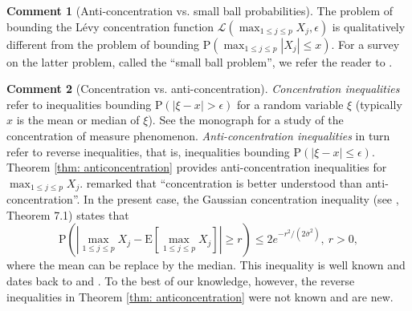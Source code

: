 \documentclass[11pt,reqno]{amsart}
\theoremstyle{definition}
\newtheorem{remark}{Comment}
\newcommand{\LL}{ \mathcal{L}}
\newcommand{\Ep}{{\mathrm{E}}}
\renewcommand{\Pr}{{\mathrm{P}}}
\begin{document}

\begin{remark}[Anti-concentration vs. small ball probabilities]
The problem of bounding the L\'{e}vy concentration function $\LL (\max_{1 \leq j \leq p} X_{j},\epsilon)$ is qualitatively different from
the problem of bounding $\Pr ( \max_{1 \leq j \leq p} | X_{j} | \leq x )$. For a survey on the latter problem, called the ``small ball problem'', we refer the reader to \cite{LS01}.
\end{remark}

\begin{remark}[Concentration vs. anti-concentration]
\label{rem: concentration vs anticoncentration}
{\em Concentration inequalities} refer to inequalities bounding $\Pr (| \xi - x | > \epsilon )$ for a random variable $\xi$ (typically $x$ is the mean or median of $\xi$). See the monograph \cite{L01} for a study of the concentration of measure phenomenon.
{\em Anti-concentration inequalities} in turn refer to reverse inequalities, that is, inequalities bounding $\Pr (| \xi - x | \leq \epsilon )$. Theorem \ref{thm: anticoncentration} provides anti-concentration inequalities for $\max_{1 \leq j \leq p} X_{j}$.
\cite{VR07} remarked that ``concentration is better understood than anti-concentration''. In the present case, the Gaussian concentration inequality (see \cite{L01}, Theorem 7.1) states that
\begin{equation*}
\Pr ( | \max_{1 \leq j \leq p} X_{j} - \Ep [ \max_{1 \leq j \leq p} X_{j} ] | \geq r) \leq 2 e^{-r^{2}/(2 \overline{\sigma}^{2})}, \ r > 0,
\end{equation*}
where the mean can be replace by the median. This inequality is well known and dates back to \cite{B75} and \cite{ST78}.
To the best of our knowledge, however, the reverse inequalities in Theorem \ref{thm: anticoncentration} were not known and are new.
\end{remark}
\end{document}
